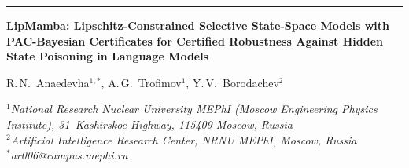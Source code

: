 \documentclass[12pt,a4paper]{article}
\theoremstyle{definition}
\theoremstyle{remark}
\newcommand{\modelname}{LipMamba}
\begin{document}
\vspace{1.0em}
\hrule
\vspace{0.6em}


\begin{center}
{\large\bfseries
\modelname{}: Lipschitz-Constrained Selective State-Space Models
with PAC-Bayesian Certificates for Certified Robustness Against
Hidden State Poisoning in Language Models
\par}

\vspace{0.6em}

{\normalsize
R.\,N.~Anaedevha$^{1,*}$, A.\,G.~Trofimov$^{1}$, Y.\,V.~Borodachev$^{2}$
\par}

\vspace{0.4em}

{\small\itshape
$^{1}$National Research Nuclear University MEPhI
(Moscow Engineering Physics Institute), 31~Kashirskoe Highway,
115409 Moscow, Russia\\
$^{2}$Artificial Intelligence Research Center, NRNU MEPhI, Moscow, Russia\\
$^{*}$ar006@campus.mephi.ru
\par}
\end{center}

\vspace{0.5em}
\end{document}
